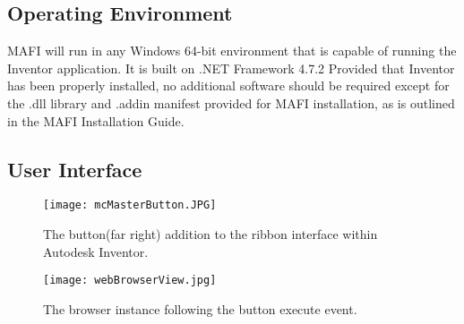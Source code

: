 \documentclass[12pt, letterpaper]{article}
\begin{document}
\subsection{Operating Environment}
MAFI will run in any Windows 64-bit environment that is capable of running the Inventor application. It is built on .NET Framework 4.7.2 Provided that Inventor has been properly installed, no additional software should be required except for the .dll library and .addin manifest provided for MAFI installation, as is outlined in the MAFI Installation Guide.
\subsection{User Interface}
\begin{figure}[H]
    \centering
    \texttt{[image: mcMasterButton.JPG]}
    \caption{The button(far right) addition to the ribbon interface within Autodesk Inventor.}
\end{figure}
\begin{figure}[H]
    \centering
    \texttt{[image: webBrowserView.jpg]}
    \caption{The browser instance following the button execute event.}
\end{figure}
\end{document}
